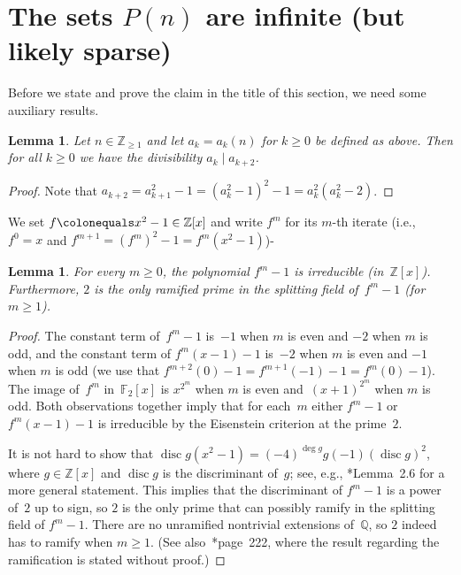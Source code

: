 \documentclass[12pt,a4paper]{amsart}
\newcommand{\Z}{{\mathbb Z}}
\newcommand{\Q}{{\mathbb Q}}
\newcommand{\F}{{\mathbb F}}
\newcommand{\disc}{\operatorname{disc}}
\newtheorem{Lemma}[Theorem]{Lemma}
\theoremstyle{definition}
\numberwithin{equation}{section}
\begin{document}

\section{The sets $P(n)$ are infinite (but likely sparse)} \label{S:P_infinite}

Before we state and prove the claim in the title of this section,
we need some auxiliary results.

\begin{Lemma} \label{L:prelim}
  Let $n \in \Z_{\geqslant 1}$ and let $a_k = a_k(n)$ for $k \geqslant 0$ be defined as above.
  Then for all $k \geqslant 0$ we have the divisibility $a_k \mid a_{k+2}$.
\end{Lemma}

\begin{proof}
  Note that $a_{k+2} = a_{k+1}^2 - 1 = (a_k^2 - 1)^2 - 1 = a_k^2 (a_k^2 - 2)$.
\end{proof}

We set $f \colonequals x^2 - 1 \in \Z[x]$ and write $f^m$ for its $m$-th iterate
(i.e., $f^0 = x$ and $f^{m+1} = (f^m)^2 - 1 = f^m(x^2 - 1)$)-

\begin{Lemma} \label{L:irred}
  For every $m \geqslant 0$, the polynomial $f^m - 1$ is irreducible (in~$\Z[x]$).
  Furthermore, $2$ is the only ramified prime in the splitting field of~$f^m - 1$
  (for $m \geqslant 1$).
\end{Lemma}

\begin{proof}
  The constant term of~$f^m - 1$ is~$-1$ when $m$ is even and $-2$ when $m$ is odd,
  and the constant term of $f^m(x-1) - 1$ is~$-2$ when $m$ is even and $-1$
  when $m$ is odd (we use that $f^{m+2}(0) - 1 = f^{m+1}(-1) - 1 = f^m(0) - 1$).
  The image of~$f^m$ in~$\F_2[x]$ is $x^{2^m}$ when $m$ is even and~$(x + 1)^{2^m}$
  when $m$ is odd. Both observations together imply that for each~$m$
  either $f^m - 1$ or $f^m(x-1) - 1$ is irreducible by the Eisenstein criterion at the prime~$2$.

  It is not hard to show that $\disc g(x^2 - 1) = (-4)^{\deg g} g(-1) (\disc g)^2$,
  where $g \in \Z[x]$ and $\disc g$ is the discriminant of~$g$; see, e.g.,
  \cite{Jones}*{Lemma~2.6} for a more general statement. This implies that
  the discriminant of $f^m - 1$ is a power of~$2$ up to sign, so $2$ is the only
  prime that can possibly ramify in the splitting field of $f^m - 1$. There
  are no unramified nontrivial extensions of~$\Q$, so $2$ indeed has to ramify when $m \geqslant 1$.
  (See also~\cite{BJ}*{page~222}, where the result regarding the ramification
  is stated without proof.)
\end{proof}
\end{document}
